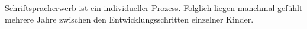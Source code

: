 Schriftspracherwerb ist ein individueller Prozess.
Folglich liegen manchmal gefühlt mehrere Jahre zwischen den Entwicklungsschritten einzelner Kinder.